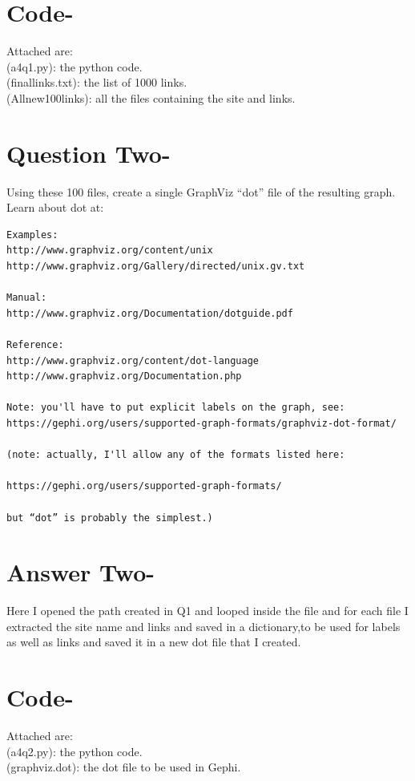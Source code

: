 \documentclass[letterpaper,11pt]{article}
\begin{document}
\section*{Code-}
Attached are:\\
(a4q1.py): the python code.\\
(finallinks.txt): the list of 1000 links.\\
(Allnew100links): all the files containing the site and links.\\

\pagebreak


\section*{Question Two-}
Using these 100 files, create a single GraphViz “dot” file of the resulting graph.  Learn about dot at:

\begin{verbatim}
Examples:
http://www.graphviz.org/content/unix
http://www.graphviz.org/Gallery/directed/unix.gv.txt

Manual:
http://www.graphviz.org/Documentation/dotguide.pdf

Reference:
http://www.graphviz.org/content/dot-language
http://www.graphviz.org/Documentation.php

Note: you'll have to put explicit labels on the graph, see:
https://gephi.org/users/supported-graph-formats/graphviz-dot-format/

(note: actually, I'll allow any of the formats listed here:

https://gephi.org/users/supported-graph-formats/

but “dot” is probably the simplest.)

\end{verbatim}
\pagebreak


\section*{Answer Two-}
Here I opened the path created in Q1 and looped inside the file and for each file I extracted the site name and links and saved in a dictionary,to be used for labels as well as links and saved it in a new dot file that I created.


\section*{Code-}
Attached are:\\
(a4q2.py): the python code.\\
(graphviz.dot): the dot file to be used in Gephi.\\
\pagebreak
\end{document}
